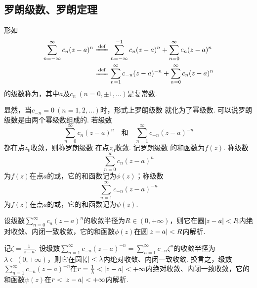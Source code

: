 \subsection{罗朗级数、罗朗定理}
\begin{definition}
形如\begin{equation}\label{equation:解析函数的级数表示.罗朗级数}
\begin{split}
\sum\limits_{n=-\infty}^\infty c_n (z-a)^n
&\defeq \sum\limits_{n=-\infty}^{-1} c_n (z-a)^n + \sum\limits_{n=0}^\infty c_n (z-a)^n \\
&\defeq \sum\limits_{n=1}^\infty c_{-n} (z-a)^{-n} + \sum\limits_{n=0}^\infty c_n (z-a)^n
\end{split}
\end{equation}的级数称为，其中\(a\)及\(c_n\ (n=0,\pm1,\dotsc)\)是复常数.
\end{definition}
显然，当\(c_{-n}=0\ (n=1,2,\dotsc)\)时，形式上罗朗级数  就化为了幂级数.
可以说罗朗级数是由两个幂级数组成的.
若级数\[
\sum\limits_{n=0}^\infty c_n (z-a)^n
\quad\text{和}\quad
\sum\limits_{n=1}^\infty c_{-n} (z-a)^{-n}
\]都在点\(z_0\)收敛，则称罗朗级数  在点\(z_0\)收敛.
记罗朗级数  的和函数为\(f(z)\).
称级数\[
\sum\limits_{n=0}^\infty c_n (z-a)^n
\]为\(f(z)\)在点\(a\)的或，它的和函数记为\(\phi(z)\)；称级数\[
\sum\limits_{n=1}^\infty c_{-n} (z-a)^{-n}
\]为\(f(z)\)在点\(a\)的或，它的和函数记为\(\psi(z)\).

设级数\(\sum\limits_{n=0}^\infty c_n (z-a)^n\)的收敛半径为\(R \in (0,+\infty)\)，则它在圆\(\abs{z-a}<R\)内绝对收敛、内闭一致收敛，它的和函数\(\phi(z)\)在圆\(\abs{z-a}<R\)内解析.

记\(\zeta = \frac{1}{z-a}\).
设级数\(\sum\limits_{n=1}^\infty c_{-n} (z-a)^{-n} = \sum\limits_{n=1}^\infty c_{-n} \zeta^n\)的收敛半径为\(\lambda \in (0,+\infty)\)，则它在圆\(\abs{\zeta} < \lambda\)内绝对收敛、内闭一致收敛.
换言之，级数\(\sum\limits_{n=1}^\infty c_{-n} (z-a)^{-n}\)在\(r = \frac{1}{\lambda} < \abs{z-a} < +\infty\)内绝对收敛、内闭一致收敛，它的和函数\(\psi(z)\)在\(r < \abs{z-a} < +\infty\)内解析.

